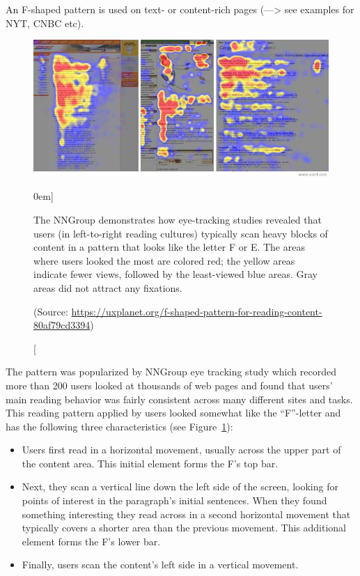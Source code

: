 An F-shaped pattern is used on text- or content-rich pages (---> see examples for NYT, CNBC etc).

\begin{figure}%
	\centering
  \includegraphics[width=1\textwidth]{../figures/f-pattern_screens.jpeg}
  \caption[][0em]{The NNGroup demonstrates how eye-tracking studies revealed that users (in left-to-right reading cultures) typically scan heavy blocks of content in a pattern that looks like the letter F or E. The areas where users looked the most are colored red; the yellow areas indicate fewer views, followed by the least-viewed blue areas. Gray areas did not attract any fixations. \par (Source: \url{https://uxplanet.org/f-shaped-pattern-for-reading-content-80af79cd3394})}
  \label{fig:f-layout}
\end{figure}

The pattern was popularized by NNGroup eye tracking study which recorded more than 200 users looked at thousands of web pages and found that users’ main reading behavior was fairly consistent across many different sites and tasks. This reading pattern applied by users looked somewhat like the ``F''-letter and has the following three characteristics (see Figure~\ref{fig:f-layout}):

\begin{itemize}
	\item Users first read in a horizontal movement, usually across the upper part of the content area. This initial element forms the F’s top bar.
	
	\item Next, they scan a vertical line down the left side of the screen, looking for points of interest in the paragraph’s initial sentences. When they found something interesting they read across in a second horizontal movement that typically covers a shorter area than the previous movement. This additional element forms the F’s lower bar.
	
	\item Finally, users scan the content’s left side in a vertical movement.
\end{itemize}

